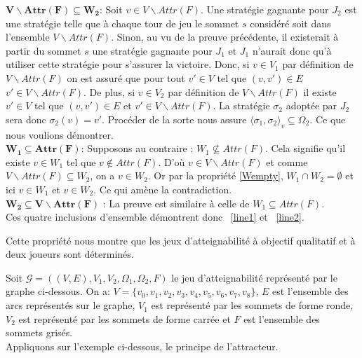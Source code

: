 \begin{demonstration}
		\noindent$\mathbf{V \backslash Attr(F) \subseteq W_{2}}$: Soit $v \in V \backslash Attr(F)$. Une stratégie gagnante pour $J_{2}$ est une stratégie telle que à chaque tour de jeu le sommet $s$ considéré soit dans l'ensemble $V\backslash Attr(F)$. Sinon, au vu de la preuve précédente, il existerait à partir du sommet $s$ une stratégie gagnante pour $J_{1}$ et $J_{1}$ n'aurait donc qu'à utiliser cette stratégie pour s'assurer la victoire. Donc, si $v \in V_{1}$ par définition de $V \backslash Attr(F)$ on est assuré que pour tout $v'\in V $ tel que $(v,v')\in E$ $v' \in V \backslash Attr(F)$. De plus, si $ v \in V_{2}$ par définition de $V \backslash Attr(F)$ il existe $v' \in V$ tel que $(v,v')\in E$ et $v' \in V \backslash Attr(F)$. La stratégie $\sigma _{2}$ adoptée par $J_{2}$ sera donc $\sigma _{2}(v)= v'$. Procéder de la sorte nous assure $\langle \sigma _{1},\sigma _{2} \rangle_v \subseteq \Omega _{2}$. Ce que nous voulions démontrer.\\
		
		\noindent $\mathbf{W_{1} \subseteq Attr(F)}$: Supposons au contraire : $W_{1} \not\subseteq Attr(F)$. Cela signifie qu'il existe $v \in W_{1}$ tel que $v \notin Attr(F)$. D'où $v \in V\backslash Attr(F)$ et comme $V \backslash Attr(F) \subseteq W_{2}$, on a $v \in W_{2}$. Or par la propriété \ref{Wempty}, $W_{1} \cap W_{2} = \emptyset $ et ici $v \in W_{1}$ et $v \in W_{2}$. Ce qui amène la contradiction.\\
		
		\noindent $\mathbf{W_{2} \subseteq V\backslash Attr(F)}$ : La preuve est similaire à celle de $W_{1} \subseteq Attr(F)$.\\
		
		Ces quatre inclusions d'ensemble démontrent donc ~\eqref{line1} et ~\eqref{line2}.
	\end{demonstration}
	\begin{rem}
		Cette propriété nous montre que les jeux d'atteignabilité à objectif qualitatif et à deux joueurs sont déterminés.
	\end{rem}
	

\begin{exemple}
Soit $\mathcal{G} = ((V,E),V_{1},V_{2},\Omega _{1}, \Omega _{2},F)$ le jeu d'atteignabilité représenté par le graphe ci-dessous. On a: $V = \{ v_{0},v_{1},v_{2},v_{3},v_{4},v_{5},v_{6},v_{7},v_{8} \}$, $E$ est l'ensemble des arcs représentés sur le graphe, $V_{1}$ est représenté par les sommets de forme ronde, $V_{2}$ est représenté par les sommets de forme carrée et $F$ est l'ensemble des sommets grisés.\\
Appliquons sur l'exemple ci-dessous, le principe de l'attracteur.


\FloatBarrier
\end{exemple}

